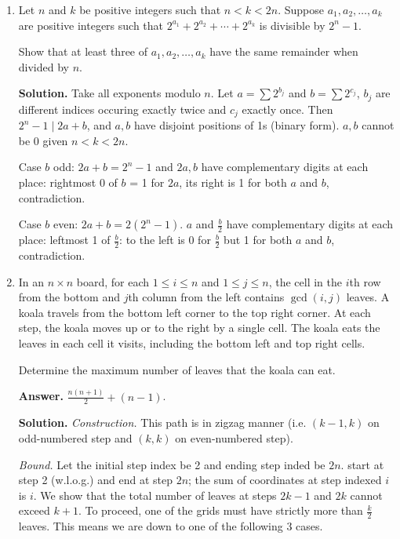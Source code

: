 \documentclass[11pt,a4paper]{article}
\begin{document}
    \begin{enumerate}
    	\item [N1.]
    	Let $n$ and $k$ be positive integers such that $n < k < 2n$. Suppose $a_1, a_2, \ldots, a_k$ are positive integers such that $2^{a_1} + 2^{a_2} + \cdots + 2^{a_k}$ is divisible by $2^n - 1$.
    	
    	Show that at least three of $a_1, a_2, \ldots, a_k$ have the same remainder when divided by $n$.
    	
    	\textbf{Solution.} Take all exponents modulo $n$. 
    	Let $a = \sum 2^{b_j}$ and $b = \sum 2^{c_j}$, 
    	$b_j$ are different indices occuring exactly twice and $c_j$ exactly once. 
    	Then $2^n-1 \mid 2a + b$, 
    	and $a, b$ have disjoint positions of 1s (binary form). 
    	$a, b$ cannot be 0 given $n < k < 2n$. 
    	
    	Case $b$ odd: $2a+b=2^n-1$ and $2a, b$ have complementary digits at each place: 
    	rightmost 0 of $b$ = 1 for $2a$, its right is 1 for both $a$ and $b$, contradiction. 
    	
    	Case $b$ even: $2a+b=2(2^n-1)$. $a$ and $\frac{b}{2}$ have complementary digits at each place: 
    	leftmost 1 of $\frac{b}{2}$: to the left is 0 for $\frac{b}{2}$ but 1 for both $a$ and $b$, contradiction. 
    	
    	\item[N2.]
    	In an $n \times n$ board, for each $1 \leq i \leq n$ and $1 \leq j \leq n$, the cell in the $i$th row from
    	the bottom and $j$th column from the left contains $\gcd(i,j)$ leaves. A koala travels from the bottom left
    	corner to the top right corner. At each step, the koala moves up or to the right by a single cell. The
    	koala eats the leaves in each cell it visits, including the bottom left and top right cells.
    	
    	Determine the maximum number of leaves that the koala can eat.
    	
    	\textbf{Answer.} $\frac{n(n+1)}{2} + (n - 1)$. 
    	
    	\textbf{Solution.} 
    	\textit{Construction.} 
    	This path is in zigzag manner (i.e. $(k-1, k)$ on odd-numbered step and $(k, k)$ on even-numbered step). 
    	
    	\textit{Bound.} 
    	Let the initial step index be 2 and ending step inded be $2n$. 
    	start at step 2 (w.l.o.g.) and end at step $2n$; 
    	the sum of coordinates at step indexed $i$ is $i$. 
    	We show that the total number of leaves at steps $2k-1$ and $2k$ cannot exceed $k + 1$. 
    	To proceed, one of the grids must have strictly more than $\frac{k}{2}$ leaves. 
    	This means we are down to one of the following 3 cases. 
    	

\end{enumerate}
\end{document}
